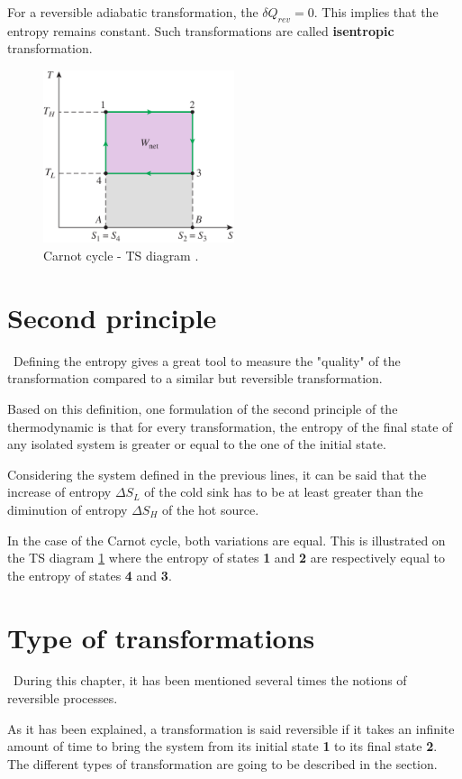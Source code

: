 For a reversible adiabatic transformation, the $\delta Q_{rev}=0$. This implies that the entropy remains constant. Such transformations are called \textbf{isentropic} transformation.
\begin{figure}[h]
\centering
\includegraphics[width=0.5\textwidth]{Carnot_TS.png}
\caption{Carnot cycle - TS diagram \cite{2015}.}
\label{fig:C3_CarnotTS}
\end{figure}
\section{Second principle}
\quad\, Defining the entropy gives a great tool to measure the "quality" of the transformation compared to a similar but reversible transformation.

Based on this definition, one formulation of the second principle of the thermodynamic is that for every transformation, the entropy of the final state of any isolated system is greater or equal to the one of the initial state.

Considering the system defined in the previous lines, it can be said that the increase of entropy $\Delta S_L$ of the cold sink has to be at least greater than the diminution of entropy $\Delta S_H$ of the hot source.

In the case of the Carnot cycle, both variations are equal. This is illustrated on the TS diagram \ref{fig:C3_CarnotTS} where the entropy of states \textbf{1} and \textbf{2} are respectively equal to the entropy of states \textbf{4} and \textbf{3}.
\section{Type of transformations}
\quad\ During this chapter, it has been mentioned several times the notions of reversible processes. 

As it has been explained, a transformation is said reversible if it takes an infinite amount of time to bring the system from its initial state \textbf{1} to its final state \textbf{2}. The different types of transformation are going to be described in the section.\newpage
